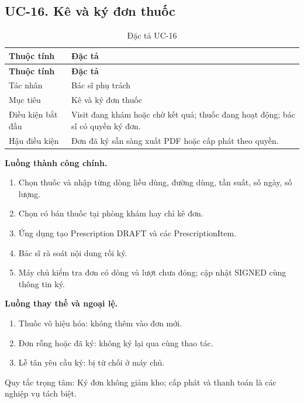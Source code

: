 \clearpage

\subsection{UC-16.\allowbreak{} Kê và ký đơn thuốc}
\label{uc:16}

{\small\setlength{\tabcolsep}{3pt}\renewcommand{\arraystretch}{1.12}
\begin{longtable}{@{}L{\textwidth-1.32pt\relax} L{\textwidth-4.68pt\relax}@{}}
\caption{Đặc tả UC-16}\\
\toprule
\textbf{Thuộc tính} & \textbf{Đặc tả}\\\midrule
\endfirsthead
\toprule
\textbf{Thuộc tính} & \textbf{Đặc tả}\\\midrule
\endhead
\bottomrule\endlastfoot
Tác nhân & Bác sĩ phụ trách\\[3pt]
Mục tiêu & Kê và ký đơn thuốc\\[3pt]
Điều kiện bắt đầu & Visit đang khám hoặc chờ kết quả; thuốc đang hoạt động; bác sĩ có quyền ký đơn.\allowbreak{}\\[3pt]
Hậu điều kiện & Đơn đã ký sẵn sàng xuất PDF hoặc cấp phát theo quyền.\allowbreak{}\\[3pt]
\end{longtable}}
\noindent\textbf{Luồng thành công chính.}
\begin{enumerate}
\item Chọn thuốc và nhập từng dòng liều dùng, đường dùng, tần suất, số ngày, số lượng.\allowbreak{}
\item Chọn có bán thuốc tại phòng khám hay chỉ kê đơn.\allowbreak{}
\item Ứng dụng tạo Prescription DRAFT và các Prescription\allowbreak{}Item.\allowbreak{}
\item Bác sĩ rà soát nội dung rồi ký.\allowbreak{}
\item Máy chủ kiểm tra đơn có dòng và lượt chưa đóng; cập nhật SIGNED cùng thông tin ký.\allowbreak{}
\end{enumerate}
\noindent\textbf{Luồng thay thế và ngoại lệ.}
\begin{enumerate}
\item Thuốc vô hiệu hóa:\allowbreak{} không thêm vào đơn mới.\allowbreak{}
\item Đơn rỗng hoặc đã ký:\allowbreak{} không ký lại qua cùng thao tác.\allowbreak{}
\item Lễ tân yêu cầu ký:\allowbreak{} bị từ chối ở máy chủ.\allowbreak{}
\end{enumerate}
Quy tắc trọng tâm:\allowbreak{} Ký đơn không giảm kho; cấp phát và thanh toán là các nghiệp vụ tách biệt.\allowbreak{}

